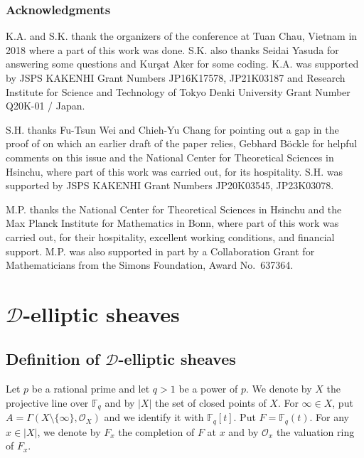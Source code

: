 \documentclass[10pt]{amsart}
\theoremstyle{plain}
\theoremstyle{definition}
\newcommand{\cO}{\mathcal{O}}
\newcommand{\bF}{\mathbb{F}}
\newcommand{\sD}{\mathscr{D}}
\begin{document}
\subsubsection*{Acknowledgments} 
K.A. and S.K. thank the organizers of the conference at Tuan Chau,
Vietnam in 2018 where a part of this work was done.
S.K. also thanks Seidai Yasuda for answering some questions and Kur\c{s}at Aker for some coding.
K.A. was supported by JSPS KAKENHI Grant Numbers 
JP16K17578, JP21K03187
and
Research Institute for Science and Technology of Tokyo Denki 
University Grant Number Q20K-01 / Japan.

S.H. thanks Fu-Tsun Wei and Chieh-Yu Chang for pointing out a gap in the proof of 
\cite[\S9.2, Lemma]{Taelman} on which an earlier draft of the paper 
 relies, Gebhard B\"{o}ckle for helpful comments on this issue and the National Center for Theoretical Sciences in Hsinchu, where part of this 
 work was carried 
out, for its hospitality. 
S.H. was supported by JSPS KAKENHI Grant Numbers JP20K03545, JP23K03078. 

M.P. thanks the National Center for Theoretical Sciences in Hsinchu and the Max Planck Institute for Mathematics in Bonn, where part 
of this work was carried out, for their hospitality, excellent working conditions, and financial support. 
M.P. was also supported in part by a Collaboration Grant for Mathematicians from the Simons Foundation, Award
No.~637364.






\section{$\sD$-elliptic sheaves}\label{SecDEll}

\subsection{Definition of $\sD$-elliptic sheaves}

Let $p$ be a rational prime and let $q>1$ be a power of $p$. We denote by $X$ the projective line over $\bF_q$
and by $|X|$ the set of closed points of $X$. 
For $\infty\in X$, put
$A=\Gamma(X\setminus\{\infty\},\cO_X)$ and we identify it with $\bF_q[t]$. 
Put $F=\bF_q(t)$. For any $x\in |X|$, we denote by $F_x$ the completion of $F$ at 
$x$ and by $\cO_x$ the valuation ring of $F_x$. 
\end{document}
